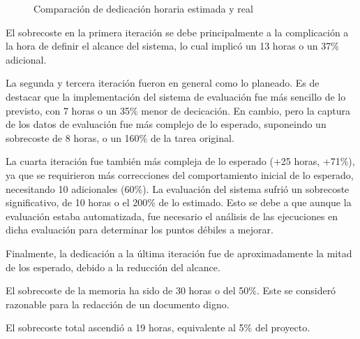 \begin{figure}[h]
\centering
{}
\caption{Comparación de dedicación horaria estimada y real}
\label{fig:horas_real}
\end{figure}

El sobrecoste en la primera iteración se debe principalmente a la complicación a la hora de definir el alcance del sistema, lo cual implicó un 13 horas o un 37\% adicional. 

La segunda y tercera iteración fueron en general como lo planeado. Es de destacar que la implementación del sistema de evaluación fue más sencillo de lo previsto, con 7 horas o un 35\% menor de decicación. En cambio, pero la captura de los datos de evaluación fue más complejo de lo esperado, suponeindo un sobrecoste de 8 horas, o un 160\% de la tarea original.

La cuarta iteración fue también más compleja de lo esperado (+25 horas, +71\%), ya que se requirieron más correcciones del comportamiento inicial de lo esperado, necesitando 10 adicionales (60\%). La evaluación del sistema sufrió un sobrecoste significativo, de 10 horas o el 200\% de lo estimado. Esto se debe a que aunque la evaluación estaba automatizada, fue necesario el análisis de las ejecuciones en dicha evaluación para determinar los puntos débiles a mejorar.

Finalmente, la dedicación a la última iteración fue de aproximadamente la mitad de los esperado, debido a la reducción del alcance.

El sobrecoste de la memoria ha sido de 30 horas o del 50\%. Este se consideró razonable para la redacción de un documento digno. 

El sobrecoste total ascendió a 19 horas, equivalente al 5\% del proyecto. 






